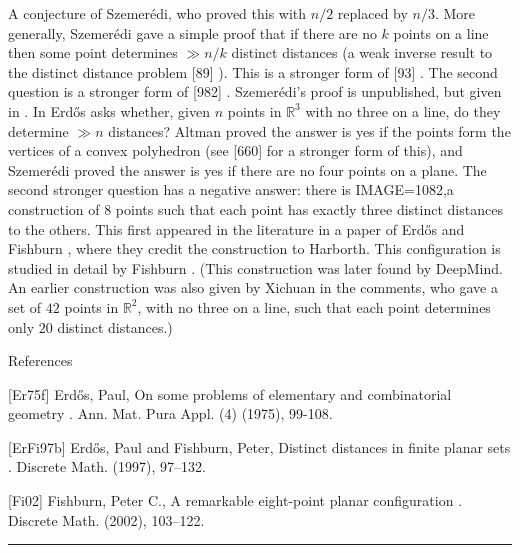 \documentclass{article}
\begin{document}
A conjecture of Szemer\'{e}di, who proved this with $n/2$ replaced by $n/3$. More generally, Szemer\'{e}di gave a simple proof that if there are no $k$ points on a line then some point determines $\gg n/k$ distinct distances (a weak inverse result to the distinct distance problem [89] ). This is a stronger form of [93] . The second question is a stronger form of [982] . Szemer\'{e}di's proof is unpublished, but given in \cite{Er75f}. In \cite{Er75f} Erd\H{o}s asks whether, given $n$ points in $\mathbb{R}^3$ with no three on a line, do they determine $\gg n$ distances? Altman proved the answer is yes if the points form the vertices of a convex polyhedron (see [660] for a stronger form of this), and Szemer\'{e}di proved the answer is yes if there are no four points on a plane. The second stronger question has a negative answer: there is {IMAGE=1082,a construction} of $8$ points such that each point has exactly three distinct distances to the others. This first appeared in the literature in a paper of Erd\H{o}s and Fishburn \cite{ErFi97b}, where they credit the construction to Harborth. This configuration is studied in detail by Fishburn \cite{Fi02}. (This construction was later found by DeepMind. An earlier construction was also given by Xichuan in the comments, who gave a set of $42$ points in $\mathbb{R}^2$, with no three on a line, such that each point determines only $20$ distinct distances.)




References

[Er75f] Erd\H{o}s, Paul, On some problems of elementary and combinatorial geometry . Ann. Mat. Pura Appl. (4) (1975), 99-108.

[ErFi97b] Erd\H{o}s, Paul and Fishburn, Peter, Distinct distances in finite planar sets . Discrete Math. (1997), 97--132.

[Fi02] Fishburn, Peter C., A remarkable eight-point planar configuration . Discrete Math. (2002), 103--122.

\noindent\rule{\linewidth}{0.4pt}
\end{document}
